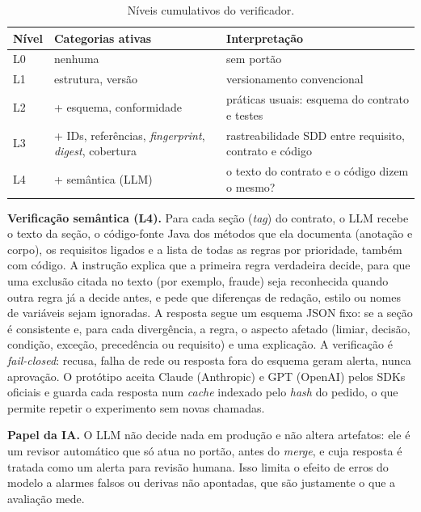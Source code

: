 \documentclass[12pt]{article}
\begin{document}
\begin{table}[!ht]
\centering
\caption{Níveis cumulativos do verificador.}
\label{tab:niveis}
\small
\begin{tabularx}{0.97\linewidth}{l l X}
\toprule
\textbf{Nível} & \textbf{Categorias ativas} & \textbf{Interpretação} \\
\midrule
L0 & nenhuma & sem portão \\
L1 & estrutura, versão & versionamento convencional \\
L2 & + esquema, conformidade & práticas usuais: esquema do contrato e testes \\
L3 & + IDs, referências, \textit{fingerprint}, \textit{digest}, cobertura & rastreabilidade SDD entre requisito, contrato e código \\
L4 & + semântica (LLM) & o texto do contrato e o código dizem o mesmo? \\
\bottomrule
\end{tabularx}
\end{table}

\textbf{Verificação semântica (L4).} Para cada seção (\textit{tag}) do contrato, o LLM recebe o texto da seção, o código-fonte Java dos métodos que ela documenta (anotação e corpo), os requisitos ligados e a lista de todas as regras por prioridade, também com código. A instrução explica que a primeira regra verdadeira decide, para que uma exclusão citada no texto (por exemplo, fraude) seja reconhecida quando outra regra já a decide antes, e pede que diferenças de redação, estilo ou nomes de variáveis sejam ignoradas. A resposta segue um esquema JSON fixo: se a seção é consistente e, para cada divergência, a regra, o aspecto afetado (limiar, decisão, condição, exceção, precedência ou requisito) e uma explicação. A verificação é \textit{fail-closed}: recusa, falha de rede ou resposta fora do esquema geram alerta, nunca aprovação. O protótipo aceita Claude (Anthropic) e GPT (OpenAI) pelos SDKs oficiais e guarda cada resposta num \textit{cache} indexado pelo \textit{hash} do pedido, o que permite repetir o experimento sem novas chamadas.

\textbf{Papel da IA.} O LLM não decide nada em produção e não altera artefatos: ele é um revisor automático que só atua no portão, antes do \textit{merge}, e cuja resposta é tratada como um alerta para revisão humana. Isso limita o efeito de erros do modelo a alarmes falsos ou derivas não apontadas, que são justamente o que a avaliação mede.

\end{document}
